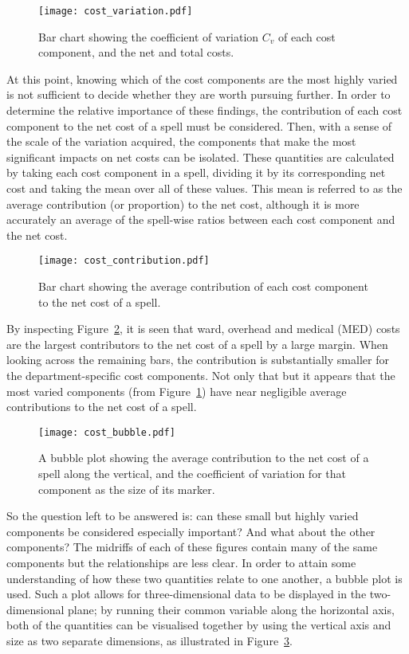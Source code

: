 \begin{figure}[h]
    \centering
    \texttt{[image: cost\_variation.pdf]}
    \caption{Bar chart showing the coefficient of variation \(C_{v}\) of each
        cost component, and the net and total costs.}\label{fig:cost_variation}
\end{figure}

At this point, knowing which of the cost components are the most highly varied
is not sufficient to decide whether they are worth pursuing further. In order to
determine the relative importance of these findings, the contribution of each
cost component to the net cost of a spell must be considered. Then, with a sense
of the scale of the variation acquired, the components that make the most
significant impacts on net costs can be isolated. These quantities are
calculated by taking each cost component in a spell, dividing it by its
corresponding net cost and taking the mean over all of these values. This mean
is referred to as the average contribution (or proportion) to the net cost,
although it is more accurately an average of the spell-wise ratios between each
cost component and the net cost.

\begin{figure}[h]
    \centering
    \texttt{[image: cost\_contribution.pdf]}
    \caption{Bar chart showing the average contribution of each cost component
        to the net cost of a spell.}\label{fig:cost_contribution}
\end{figure}

By inspecting Figure~\ref{fig:cost_contribution}, it is seen that ward, overhead
and medical (MED) costs are the largest contributors to the net cost of a spell
by a large margin. When looking across the remaining bars, the contribution is
substantially smaller for the department-specific cost components. Not only that
but it appears that the most varied components (from
Figure~\ref{fig:cost_variation}) have near negligible average contributions to
the net cost of a spell.

\begin{figure}[htbp]
    \centering
    \texttt{[image: cost\_bubble.pdf]}
    \caption{A bubble plot showing the average contribution to the net cost of a
    spell along the vertical, and the coefficient of variation for that
    component as the size of its marker.}\label{fig:cost_bubble}
\end{figure}

So the question left to be answered is: can these small but highly varied
components be considered especially important? And what about the other
components? The midriffs of each of these figures contain many of the same
components but the relationships are less clear. In order to attain some
understanding of how these two quantities relate to one another, a bubble plot
is used. Such a plot allows for three-dimensional data to be displayed in the
two-dimensional plane; by running their common variable along the horizontal
axis, both of the quantities can be visualised together by using the vertical
axis and size as two separate dimensions, as illustrated in
Figure~\ref{fig:cost_bubble}.

